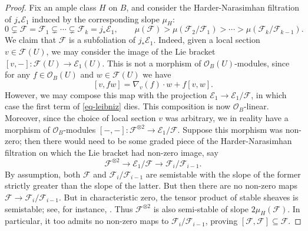 \documentclass[12pt]{amsart}
\theoremstyle{definition}
\theoremstyle{remark}
\numberwithin{equation}{section}
\begin{document}
\begin{proof}
Fix an ample class \(H\) on \(B\), and consider the Harder-Narasimhan filtration of
\(j_* \mathcal{E}_1\) induced by the corresponding slope \(\mu_H\):
\begin{equation} \label{eq-hn-filtration}
    0 \subsetneq \mathcal{F} = \mathcal{F}_1 \subsetneq \cdots \subsetneq 
    \mathcal{F}_k = j_*\mathcal{E}_1, \qquad \mu(\mathcal{F}) > 
    \mu(\mathcal{F}_2 / \mathcal{F}_1) > \cdots > 
    \mu(\mathcal{F}_{k} / \mathcal{F}_{k-1}).
\end{equation}
We claim that \(\mathcal{F}\) is a subfoliation of \(j_* \mathcal{E}_1\). Indeed, 
given a local section \(v \in \mathcal{F}(U)\), we may consider the image of the 
Lie bracket \([v, -]: \mathcal{F}(U) \to \mathcal{E}_1(U)\). This is not a morphism
of \(\mathcal{O}_B(U)\)-modules, since for any \(f \in \mathcal{O}_B(U)\) and 
\(w \in \mathcal{F}(U)\) we have
\begin{equation} \label{eq-leibniz}
    [v, fw] = \nabla_v(f)\cdot w + f[v, w].
\end{equation}
However, we may compose this map with the projection 
\(\mathcal{E}_1 \to \mathcal{E}_1 / \mathcal{F}\), in which case the first term of 
\eqref{eq-leibniz} dies. This composition is now \(\mathcal{O}_B\)-linear. Moreover,
since the choice of local section \(v\) was arbitrary, we in reality have a morphism 
of \(\mathcal{O}_B\)-modules \([-,-]: \mathcal{F}^{\otimes 2} \to 
\mathcal{E}_1 / \mathcal{F}\). Suppose this morphism was non-zero; then 
there would need to be some graded piece of the Harder-Narasimhan filtration on which
the Lie bracket had non-zero image, say 
\begin{equation} \label{eq-hn-tensor}
    \mathcal{F}^{\otimes 2} \to \mathcal{E}_1 / \mathcal{F} \to 
    \mathcal{F}_i / \mathcal{F}_{i-1}.
\end{equation}
By assumption, both \(\mathcal{F}\) and \(\mathcal{F}_i / \mathcal{F}_{i-1}\) are 
semistable with the slope of the former strictly greater than the slope of the latter.
But then there are no non-zero maps 
\(\mathcal{F} \to \mathcal{F}_i / \mathcal{F}_{i-1}\). But in characteristic zero,
the tensor product of stable sheaves is semistable; see, for instance, 
\cite[\S 2.1.2]{langer05}. Thus \(\mathcal{F}^{\otimes 2}\) is also semi-stable of slope
\(2 \mu_H(\mathcal{F})\). In particular,
it too admits no non-zero maps to \(\mathcal{F}_i / \mathcal{F}_{i-1}\),
proving \([\mathcal{F}, \mathcal{F}] \subseteq \mathcal{F}\).


\end{proof}
\end{document}
